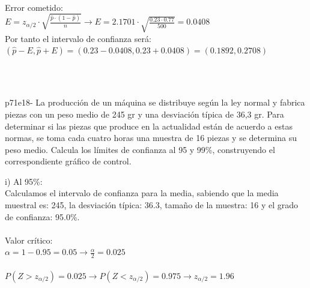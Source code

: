 \documentclass[spanish, 11pt]{exam}
\begin{document}
\begin{questions}
\begin{solution}
 \\
    Error cometido: \\ $E=z_{\alpha / 2}\cdot \sqrt{\frac{\widehat{p}\cdot\left(1-\widehat{p} \right)}{n}} \to E=2.1701\cdot \sqrt{\frac{0.23\cdot0.77}{500}}=0.0408$ \\ Por tanto el intervalo de confianza será: \\$\left(\widehat{p} - E , \widehat{p} + E \right)=\left(0.23 - 0.0408 , 0.23 + 0.0408 \right)=\left(0.1892, 0.2708 \right)$ \\  \\ 
     \\
       \end{solution}\question p71e18- La producción de un máquina se distribuye según la ley normal y fabrica piezas con un peso 
medio de 245
gr y una desviación típica de 36,3 gr. Para determinar si las piezas que produce en la actualidad están de
acuerdo a estas normas, se toma cada cuatro horas una muestra de 16 piezas y se determina su peso medio.
Calcula los límites de confianza al 95 y 99\%, construyendo el correspondiente gráfico de control. \begin{solution}   i) Al 95\%: \\  Calculamos el intervalo de confianza para la media, sabiendo que la media muestral es: 245, la desviación típica: 36.3, tamaño de la muestra: 16 y el grado de confianza: 95.0\%. \\ \\ Valor crítico: \\ $\alpha=1-0.95=0.05\to \frac{\alpha}{2}=0.025$ \\ \\ $P(Z>z_{\alpha/2})=0.025\to P(Z<z_{\alpha/2})=0.975 \to z_{\alpha/2} =1.96$ \\ 

\end{solution}
\end{questions}
\end{document}
